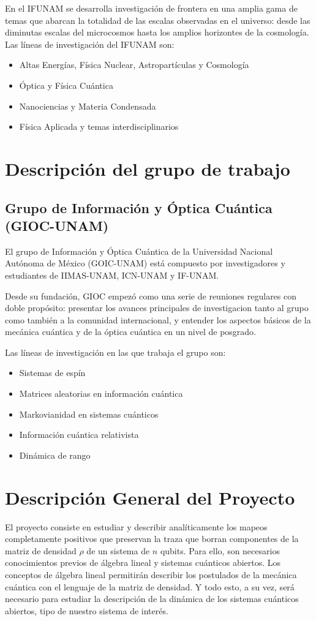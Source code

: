\documentclass[11pt, spanish, letterpage]{article}
\begin{document}
En el IFUNAM se desarrolla investigación de frontera en una amplia gama de temas que abarcan la totalidad de las escalas observadas en el universo: desde las diminutas escalas del microcosmos hasta los amplios horizontes de la cosmología. Las líneas de investigación del IFUNAM son:
\begin{itemize}
	\item Altas Energías, Física Nuclear, Astropartículas y Cosmología
	\item Óptica y Física Cuántica
	\item Nanociencias y Materia Condensada
	\item Física Aplicada y temas interdisciplinarios
\end{itemize}


\section{Descripción del grupo de trabajo}
\subsection{Grupo de Información y Óptica Cuántica (GIOC-UNAM)}
El grupo de Información y Óptica Cuántica de la Universidad Nacional Autónoma de México (GOIC-UNAM) está compuesto por investigadores y estudiantes de IIMAS-UNAM, ICN-UNAM y IF-UNAM. 

Desde su fundación, GIOC empezó como una serie de reuniones regulares con doble propósito: presentar los avances principales de investigacion tanto al grupo como también a la comunidad internacional, y entender los aspectos básicos de la mecánica cuántica y de la óptica cuántica en un nivel de posgrado. 

Las líneas de investigación en las que trabaja el grupo son:
\begin{itemize}
	\item Sistemas de espín
	\item Matrices aleatorias en información cuántica
	\item Markovianidad en sistemas cuánticos
	\item Información cuántica relativista
	\item Dinámica de rango
\end{itemize}

\section{Descripción General del Proyecto}
El proyecto consiste en estudiar y describir analíticamente los mapeos completamente positivos que preservan la traza que borran componentes de la matriz de densidad $\rho$ de un sistema de $n$ qubits. Para ello, son necesarios conocimientos previos de álgebra lineal y sistemas cuánticos abiertos. Los conceptos de álgebra lineal permitirán describir los postulados de la mecánica cuántica con el lenguaje de la matriz de densidad. Y todo esto, a su vez, será necesario para estudiar la descripción de la dinámica de los sistemas cuánticos abiertos, tipo de nuestro sistema de interés.
\end{document}
